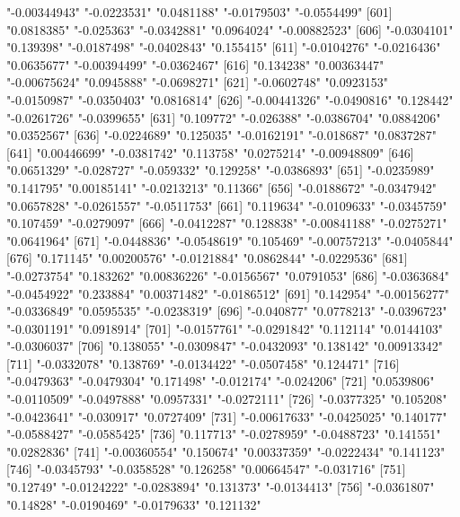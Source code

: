 \begin{Schunk}
\begin{Soutput}
[596] "-0.00344943"  "-0.0223531"   "0.0481188"    "-0.0179503"   "-0.0554499"  
[601] "0.0818385"    "-0.025363"    "-0.0342881"   "0.0964024"    "-0.00882523" 
[606] "-0.0304101"   "0.139398"     "-0.0187498"   "-0.0402843"   "0.155415"    
[611] "-0.0104276"   "-0.0216436"   "0.0635677"    "-0.00394499"  "-0.0362467"  
[616] "0.134238"     "0.00363447"   "-0.00675624"  "0.0945888"    "-0.0698271"  
[621] "-0.0602748"   "0.0923153"    "-0.0150987"   "-0.0350403"   "0.0816814"   
[626] "-0.00441326"  "-0.0490816"   "0.128442"     "-0.0261726"   "-0.0399655"  
[631] "0.109772"     "-0.026388"    "-0.0386704"   "0.0884206"    "0.0352567"   
[636] "-0.0224689"   "0.125035"     "-0.0162191"   "-0.018687"    "0.0837287"   
[641] "0.00446699"   "-0.0381742"   "0.113758"     "0.0275214"    "-0.00948809" 
[646] "0.0651329"    "-0.028727"    "-0.059332"    "0.129258"     "-0.0386893"  
[651] "-0.0235989"   "0.141795"     "0.00185141"   "-0.0213213"   "0.11366"     
[656] "-0.0188672"   "-0.0347942"   "0.0657828"    "-0.0261557"   "-0.0511753"  
[661] "0.119634"     "-0.0109633"   "-0.0345759"   "0.107459"     "-0.0279097"  
[666] "-0.0412287"   "0.128838"     "-0.00841188"  "-0.0275271"   "0.0641964"   
[671] "-0.0448836"   "-0.0548619"   "0.105469"     "-0.00757213"  "-0.0405844"  
[676] "0.171145"     "0.00200576"   "-0.0121884"   "0.0862844"    "-0.0229536"  
[681] "-0.0273754"   "0.183262"     "0.00836226"   "-0.0156567"   "0.0791053"   
[686] "-0.0363684"   "-0.0454922"   "0.233884"     "0.00371482"   "-0.0186512"  
[691] "0.142954"     "-0.00156277"  "-0.0336849"   "0.0595535"    "-0.0238319"  
[696] "-0.040877"    "0.0778213"    "-0.0396723"   "-0.0301191"   "0.0918914"   
[701] "-0.0157761"   "-0.0291842"   "0.112114"     "0.0144103"    "-0.0306037"  
[706] "0.138055"     "-0.0309847"   "-0.0432093"   "0.138142"     "0.00913342"  
[711] "-0.0332078"   "0.138769"     "-0.0134422"   "-0.0507458"   "0.124471"    
[716] "-0.0479363"   "-0.0479304"   "0.171498"     "-0.012174"    "-0.024206"   
[721] "0.0539806"    "-0.0110509"   "-0.0497888"   "0.0957331"    "-0.0272111"  
[726] "-0.0377325"   "0.105208"     "-0.0423641"   "-0.030917"    "0.0727409"   
[731] "-0.00617633"  "-0.0425025"   "0.140177"     "-0.0588427"   "-0.0585425"  
[736] "0.117713"     "-0.0278959"   "-0.0488723"   "0.141551"     "0.0282836"   
[741] "-0.00360554"  "0.150674"     "0.00337359"   "-0.0222434"   "0.141123"    
[746] "-0.0345793"   "-0.0358528"   "0.126258"     "0.00664547"   "-0.031716"   
[751] "0.12749"      "-0.0124222"   "-0.0283894"   "0.131373"     "-0.0134413"  
[756] "-0.0361807"   "0.14828"      "-0.0190469"   "-0.0179633"   "0.121132"    

\end{Soutput}
\end{Schunk}
